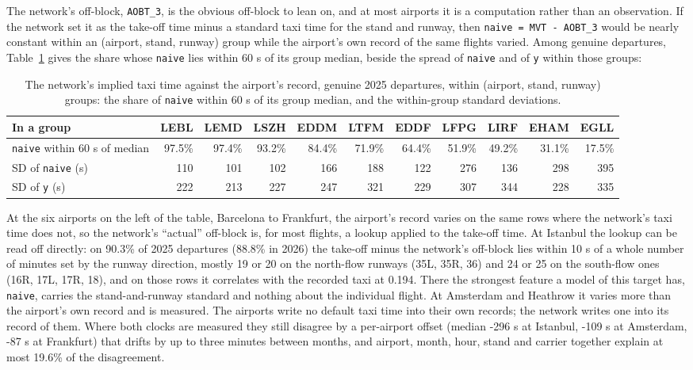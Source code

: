\documentclass[
  manuscript=article,
  layout=preprint,
  year=2026,
  volume=x,
]{extra/joas}
\begin{document}
The network's off-block, \texttt{AOBT\_3}, is the obvious off-block to lean on, and at most airports it is a computation rather than an observation. If the network set it as the take-off time minus a standard taxi time for the stand and runway, then \texttt{naive\ =\ MVT\ -\ AOBT\_3} would be nearly constant within an (airport, stand, runway) group while the airport's own record of the same flights varied. Among genuine departures, Table~\ref{tab:5} gives the share whose \texttt{naive} lies within 60 s of its group median, beside the spread of \texttt{naive} and of \texttt{y} within those groups:

\begin{table}[htbp!]
  \centering
  \small
  \setlength{\tabcolsep}{3pt}\renewcommand{\arraystretch}{1.15}
  \caption{The network's implied taxi time against the airport's record, genuine 2025 departures, within (airport, stand, runway) groups: the share of \texttt{naive} within 60 s of its group median, and the within-group standard deviations.}
  \label{tab:5}
  \begin{tabular*}{\linewidth}{@{\extracolsep{\fill}}lrrrrrrrrrr}
  \toprule
  \textbf{In a group} & \textbf{LEBL} & \textbf{LEMD} & \textbf{LSZH} & \textbf{EDDM} & \textbf{LTFM} & \textbf{EDDF} & \textbf{LFPG} & \textbf{LIRF} & \textbf{EHAM} & \textbf{EGLL} \\
  \midrule
  \texttt{naive} within 60 s of median & 97.5\% & 97.4\% & 93.2\% & 84.4\% & 71.9\% & 64.4\% & 51.9\% & 49.2\% & 31.1\% & 17.5\% \\
  SD of \texttt{naive} (s) & 110 & 101 & 102 & 166 & 188 & 122 & 276 & 136 & 298 & 395 \\
  SD of \texttt{y} (s) & 222 & 213 & 227 & 247 & 321 & 229 & 307 & 344 & 228 & 335 \\
  \bottomrule
  \end{tabular*}
\end{table}

At the six airports on the left of the table, Barcelona to Frankfurt, the airport's record varies on the same rows where the network's taxi time does not, so the network's ``actual'' off-block is, for most flights, a lookup applied to the take-off time. At Istanbul the lookup can be read off directly: on 90.3\% of 2025 departures (88.8\% in 2026) the take-off minus the network's off-block lies within 10 s of a whole number of minutes set by the runway direction, mostly 19 or 20 on the north-flow runways (35L, 35R, 36) and 24 or 25 on the south-flow ones (16R, 17L, 17R, 18), and on those rows it correlates with the recorded taxi at 0.194. There the strongest feature a model of this target has, \texttt{naive}, carries the stand-and-runway standard and nothing about the individual flight. At Amsterdam and Heathrow it varies more than the airport's own record and is measured. The airports write no default taxi time into their own records; the network writes one into its record of them. Where both clocks are measured they still disagree by a per-airport offset (median -296 s at Istanbul, -109 s at Amsterdam, -87 s at Frankfurt) that drifts by up to three minutes between months, and airport, month, hour, stand and carrier together explain at most 19.6\% of the disagreement.
\end{document}
